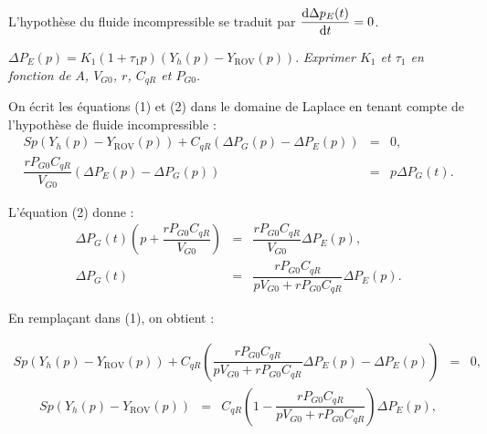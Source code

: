 \begin{multicols}{2}
%
%
%
%
% 
% 
%  
% 
%

L’hypothèse du fluide incompressible se traduit par $\dfrac{\text d\Delta p_E(t)}{\text dt}= 0$.
\fi

$\Delta P_E(p) = K_1(1+\tau_1 p)(Y_h(p)-Y_{\text{ROV}}(p)).$
\textit{Exprimer $K_1$ et $\tau_1$ en fonction de $A$, $V_{G0}$, $r$, $C_{qR}$ et $P_{G0}$.}
\ifprof
\begin{corrige}
On écrit les équations (1) et (2) dans le domaine de Laplace en tenant compte de l'hypothèse de fluide incompressible :
 \begin{eqnarray}
{Sp}\left( Y_h(p)-  Y_{\text{ROV}}(p)\right)+C_{qR}\left(\Delta P_G(p)-\Delta P_E(p)\right) &=&0, \\
\dfrac{rP_{G0}C_{qR}}{V_{G0}}\left(\Delta P_E(p)-\Delta P_G(p)\right) &=&p \Delta P_G(t).
\end{eqnarray}

L'équation (2) donne :
 \begin{eqnarray}
\Delta P_G(t)\left(p+\dfrac{rP_{G0}C_{qR}}{V_{G0}}\right)&=&\dfrac{rP_{G0}C_{qR}}{V_{G0}}\Delta P_E(p), \nonumber \\
\Delta P_G(t)&=&\dfrac{rP_{G0}C_{qR}}{pV_{G0}+{rP_{G0}C_{qR}}}\Delta P_E(p).\nonumber
\end{eqnarray}

En remplaçant dans (1), on obtient : 

 \begin{eqnarray}
{Sp}\left( Y_h(p)-  Y_{\text{ROV}}(p)\right)+C_{qR}\left(\dfrac{rP_{G0}C_{qR}}{pV_{G0}+{rP_{G0}C_{qR}}}\Delta P_E(p)-\Delta P_E(p)\right) &=&0, \nonumber
\end{eqnarray}
 \begin{eqnarray}
{Sp}\left( Y_h(p)-  Y_{\text{ROV}}(p)\right)&=&C_{qR}\left(1-\dfrac{rP_{G0}C_{qR}}{pV_{G0}+{rP_{G0}C_{qR}}}\right) \Delta P_E(p), \nonumber
\end{eqnarray}


\end{corrige}
\end{multicols}

